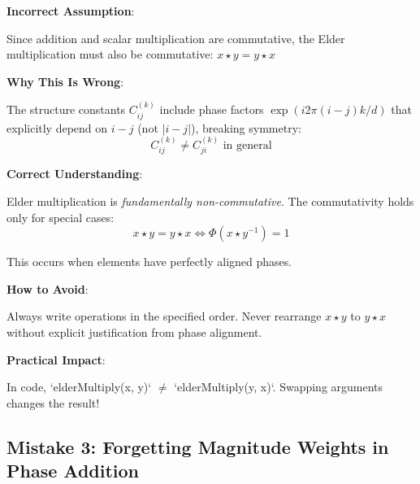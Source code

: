 \begin{warning}
\textbf{Incorrect Assumption}:

Since addition and scalar multiplication are commutative, the Elder multiplication must also be commutative: $x \star y = y \star x$

\textbf{Why This Is Wrong}:

The structure constants $C_{ij}^{(k)}$ include phase factors $\exp(i2\pi(i-j)k/d)$ that explicitly depend on $i-j$ (not $|i-j|$), breaking symmetry:
$$C_{ij}^{(k)} \neq C_{ji}^{(k)} \text{ in general}$$

\textbf{Correct Understanding}:

Elder multiplication is \textit{fundamentally non-commutative}. The commutativity holds only for special cases:
$$x \star y = y \star x \iff \Phi(x \star y^{-1}) = 1$$

This occurs when elements have perfectly aligned phases.

\textbf{How to Avoid}:

Always write operations in the specified order. Never rearrange $x \star y$ to $y \star x$ without explicit justification from phase alignment.

\textbf{Practical Impact}:

In code, `elderMultiply(x, y)` $\neq$ `elderMultiply(y, x)`. Swapping arguments changes the result!
\end{warning}

\subsection{Mistake 3: Forgetting Magnitude Weights in Phase Addition}

